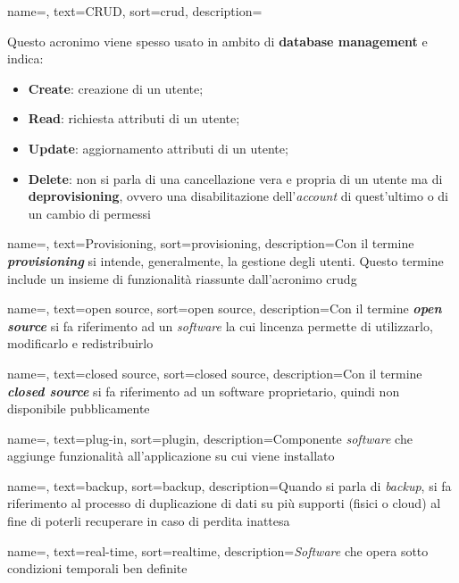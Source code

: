 {
    name=,
    text=CRUD,
    sort=crud,
    description={Questo acronimo viene spesso usato in ambito di \textbf{database management} e indica:
    \begin{itemize}
        \item \textbf{Create}: creazione di un utente;
        \item \textbf{Read}: richiesta attributi di un utente;
        \item \textbf{Update}: aggiornamento attributi di un utente;
        \item \textbf{Delete}: non si parla di una cancellazione vera e propria di un utente ma di \textbf{deprovisioning}, ovvero una disabilitazione dell'\textit{account} di quest'ultimo o di un cambio di permessi
    \end{itemize}}
}

{
    name=,
    text=Provisioning,
    sort=provisioning,
    description={Con il termine \textit{\textbf{provisioning}} si intende, generalmente, la gestione degli utenti. Questo termine include un insieme di funzionalità riassunte dall'acronimo \gls{crudg}}
}

{
    name=,
    text=open source,
    sort=open source,
    description={Con il termine \textit{\textbf{open source}} si fa riferimento ad un \textit{software} la cui lincenza permette di utilizzarlo, modificarlo e redistribuirlo}
}

{
    name=,
    text=closed source,
    sort=closed source,
    description={Con il termine \textit{\textbf{closed source}} si fa riferimento ad un software proprietario, quindi non disponibile pubblicamente}
}

{
    name=,
    text=plug-in,
    sort=plugin,
    description={Componente \textit{software} che aggiunge funzionalità all'applicazione su cui viene installato}
}

{
    name=,
    text=backup,
    sort=backup,
    description={Quando si parla di \textit{backup}, si fa riferimento al processo di duplicazione di dati su più supporti (fisici o cloud) al fine di poterli recuperare in caso di perdita inattesa}
}

{
    name=,
    text=real-time,
    sort=realtime,
    description={\textit{Software} che opera sotto condizioni temporali ben definite}
}

